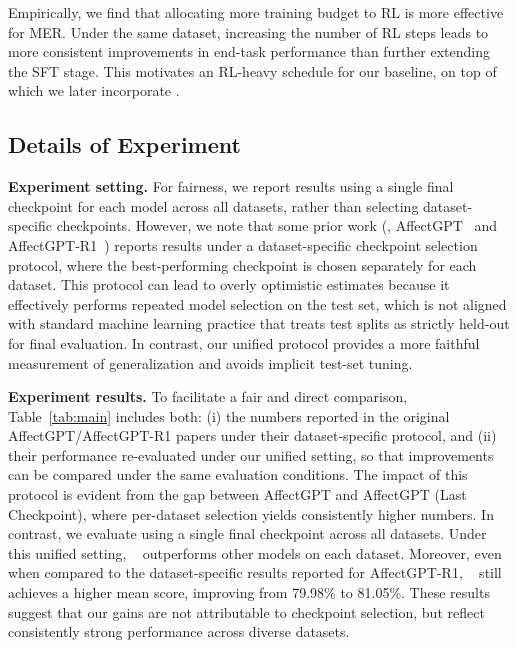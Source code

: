 \documentclass{article}
\theoremstyle{plain}
\theoremstyle{definition}
\theoremstyle{remark}
\begin{document}
Empirically, we find that allocating more training budget to RL is more effective for MER.
Under the same dataset, increasing the number of RL steps leads to more consistent improvements in end-task performance than further extending the SFT stage.
This motivates an RL-heavy schedule for our baseline, on top of which we later incorporate \ourmethod.





\subsection{Details of Experiment}
\label{appendix:evaluation-setting}

\noindent\textbf{Experiment setting.}
For fairness, we report results using a single final checkpoint for each model across all datasets, rather than selecting dataset-specific checkpoints.
However, we note that some prior work (\eg, AffectGPT~\cite{lian2025affectgpt} and AffectGPT-R1~\cite{lian2025affectgptr1}) reports results under a dataset-specific checkpoint selection protocol, where the best-performing checkpoint is chosen separately for each dataset.
This protocol can lead to overly optimistic estimates because it effectively performs repeated model selection on the test set, which is not aligned with standard machine learning practice that treats test splits as strictly held-out for final evaluation.
In contrast, our unified protocol provides a more faithful measurement of generalization and avoids implicit test-set tuning.

\noindent\textbf{Experiment results.}
To facilitate a fair and direct comparison, Table~\ref{tab:main} includes both: (i) the numbers reported in the original AffectGPT/AffectGPT-R1 papers under their dataset-specific protocol, and (ii) their performance re-evaluated under our unified setting, so that improvements can be compared under the same evaluation conditions.
The impact of this protocol is evident from the gap between AffectGPT and AffectGPT (Last Checkpoint), where per-dataset selection yields consistently higher numbers. In contrast, we evaluate using a single final checkpoint across all datasets. Under this unified setting, \ourmethod~ outperforms other models on each dataset. Moreover, even when compared to the dataset-specific results reported for AffectGPT-R1, \ourmethod~ still achieves a higher mean score, improving from 79.98\% to 81.05\%. These results suggest that our gains are not attributable to checkpoint selection, but reflect consistently strong performance across diverse datasets.
\end{document}
